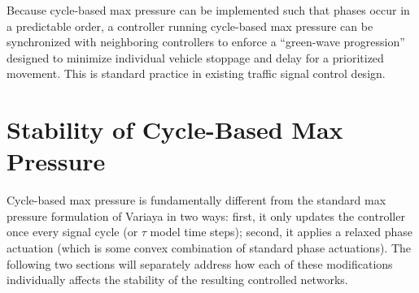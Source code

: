 Because cycle-based max pressure can be implemented such that phases occur in a predictable order, a controller running cycle-based max pressure can be synchronized with neighboring controllers to enforce a ``green-wave progression'' designed to minimize individual vehicle stoppage and delay for a prioritized movement. This is standard practice in existing traffic signal control design. 

\section{Stability of Cycle-Based Max Pressure}
Cycle-based max pressure is fundamentally different from the standard max pressure formulation of Variaya \cite{MaxPressureStochastic} in two ways: first, it only updates the controller once every signal cycle (or $\tau$ model time steps); second, it applies a relaxed phase actuation (which is some convex combination of standard phase actuations). The following two sections will separately address how each of these modifications individually affects the stability of the resulting controlled networks. 

